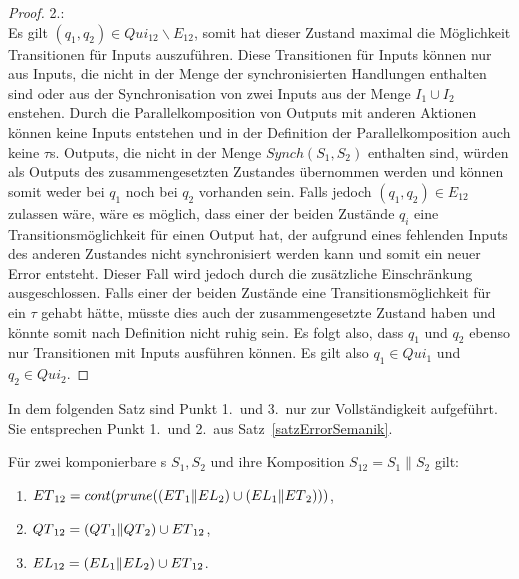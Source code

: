 \begin{proof}
  2.:\\
  Es gilt $(q_1,q_2)\in Qui_{12}\backslash E_{12}$, somit hat
  dieser Zustand maximal die Möglichkeit Transitionen für Inputs auszuführen.
  Diese Transitionen für Inputs können nur aus Inputs, die nicht in der Menge
  der synchronisierten Handlungen enthalten sind oder aus der Synchronisation
  von zwei Inputs aus der Menge $I_1\cup I_2$ enstehen. Durch die
  Parallelkomposition von Outputs mit anderen Aktionen können keine Inputs
  entstehen und in der Definition der Parallelkomposition auch keine
  $\tau$s. Outputs, die nicht in der Menge $Synch(S_1,S_2)$ enthalten sind,
  würden als Outputs des zusammengesetzten Zustandes übernommen werden und
  können somit weder bei $q_1$ noch bei $q_2$ vorhanden sein. Falls jedoch
  $(q_1,q_2)\in E_{12}$ zulassen wäre, wäre es möglich, dass einer der beiden
  Zustände $q_i$ eine Transitionsmöglichkeit für einen Output hat, der aufgrund
  eines fehlenden Inputs des anderen Zustandes nicht synchronisiert werden kann
  und somit ein neuer Error entsteht. Dieser Fall wird jedoch durch die
  zusätzliche Einschränkung ausgeschlossen. Falls einer der beiden Zustände
  eine Transitionsmöglichkeit für ein $\tau$ gehabt hätte, müsste dies auch der
  zusammengesetzte Zustand haben und könnte somit nach Definition
  nicht ruhig sein. Es folgt also, dass $q_1$ und $q_2$ ebenso nur
  Transitionen mit Inputs ausführen können. Es gilt also $q_1\in Qui_1$ und
  $q_2\in Qui_2$.
\end{proof}

In dem folgenden Satz sind Punkt 1.\ und 3.\ nur zur Vollständigkeit aufgeführt.
Sie entsprechen Punkt 1.\ und 2.\ aus Satz~\ref{satzErrorSemanik}.

\begin{satz}
  \label{satzQuiSemantik}
  Für zwei komponierbare \EIO{}s $S_1, S_2$ und ihre Komposition $S_{12} =
  S_1\|S_2$ gilt:
  \begin{enumerate}
    \item $ET{}_{12} = cont{}(prune{}((ET{}_1\|EL{}_2)\cup (EL{}_1\|ET{}_2)))$,
    \item $QT{}_{12} = (QT{}_1\|QT{}_2)\cup ET{}_{12}$,
    \item $EL{}_{12} = (EL{}_1\|EL{}_2)\cup ET{}_{12}$.
  \end{enumerate}
\end{satz}

